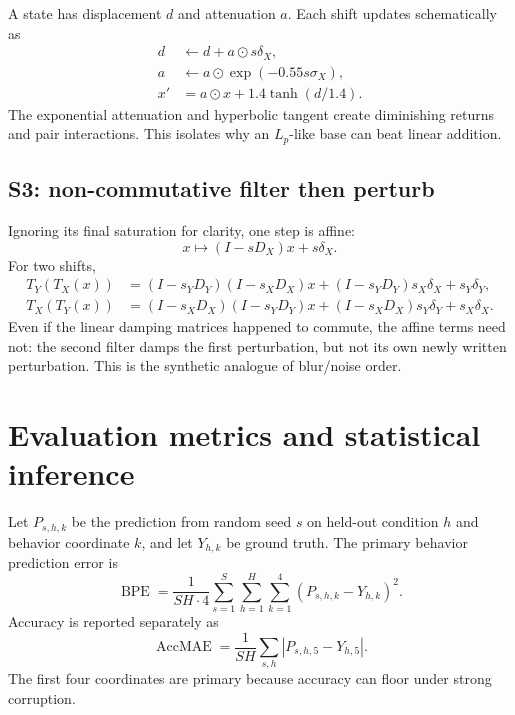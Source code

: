 \documentclass[11pt,a4paper]{article}
\newcommand{\od}{\odot}
\newcommand{\BPE}{\operatorname{BPE}}
\begin{document}
A state has displacement $d$ and attenuation $a$.  Each shift updates
schematically as
\begin{align}
d&\leftarrow d+a\od s\delta_X,\\
a&\leftarrow a\od\exp(-0.55s\sigma_X),\\
x'&=a\od x+1.4\tanh(d/1.4).
\end{align}
The exponential attenuation and hyperbolic tangent create diminishing returns
and pair interactions.  This isolates why an $L_p$-like base can beat linear
addition.

\subsection{S3: non-commutative filter then perturb}

Ignoring its final saturation for clarity, one step is affine:
\begin{equation}
x\longmapsto (I-sD_X)x+s\delta_X.
\end{equation}
For two shifts,
\begin{align}
T_Y(T_X(x))&=(I-s_YD_Y)(I-s_XD_X)x
 +(I-s_YD_Y)s_X\delta_X+s_Y\delta_Y,\\
T_X(T_Y(x))&=(I-s_XD_X)(I-s_YD_Y)x
 +(I-s_XD_X)s_Y\delta_Y+s_X\delta_X.
\end{align}
Even if the linear damping matrices happened to commute, the affine terms need
not: the second filter damps the first perturbation, but not its own newly
written perturbation.  This is the synthetic analogue of blur/noise order.

\section{Evaluation metrics and statistical inference}

Let $P_{s,h,k}$ be the prediction from random seed $s$ on held-out condition
$h$ and behavior coordinate $k$, and let $Y_{h,k}$ be ground truth.  The
primary behavior prediction error is
\begin{equation}
\BPE=\frac1{S H\cdot4}\sum_{s=1}^{S}\sum_{h=1}^{H}
\sum_{k=1}^{4}(P_{s,h,k}-Y_{h,k})^2.
\label{eq:bpe}
\end{equation}
Accuracy is reported separately as
\[
\operatorname{AccMAE}=\frac1{SH}\sum_{s,h}|P_{s,h,5}-Y_{h,5}|.
\]
The first four coordinates are primary because accuracy can floor under strong
corruption.
\end{document}
